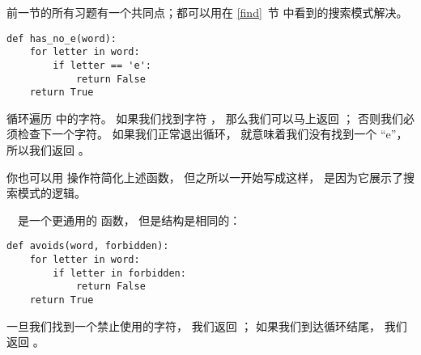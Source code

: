 
前一节的所有习题有一个共同点；都可以用在 \ref{find}~节 中看到的搜索模式解决。

\begin{lstlisting}
def has_no_e(word):
    for letter in word:
        if letter == 'e':
            return False
    return True
\end{lstlisting}

%

 循环遍历  中的字符。
如果我们找到字符 ， 那么我们可以马上返回  ；
否则我们必须检查下一个字符。
如果我们正常退出循环， 就意味着我们没有找到一个 ``e''， 所以我们返回  。


  


你也可以用  操作符简化上述函数， 但之所以一开始写成这样， 是因为它展示了搜索模式的逻辑。



　是一个更通用的  函数， 但是结构是相同的：

\begin{lstlisting}
def avoids(word, forbidden):
    for letter in word:
        if letter in forbidden:
            return False
    return True
\end{lstlisting}


一旦我们找到一个禁止使用的字符， 我们返回  ；
如果我们到达循环结尾， 我们返回  。


